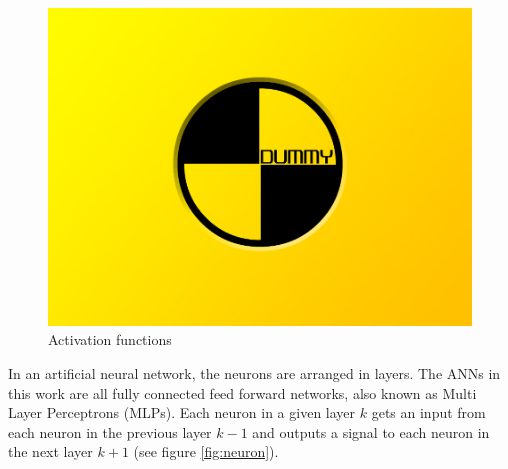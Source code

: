 \begin{figure}[h]
	\includegraphics[width=\textwidth]{src/pics/dummy.jpg}
	\caption{Activation functions \cite{Zuern2017}}
	\label{fig:activation_functions} 
\end{figure}

In an artificial neural network, the neurons are arranged in layers. The ANNs in this work are all fully connected feed forward networks, also known as Multi Layer Perceptrons (MLPs). Each neuron in a given layer $k$ gets an input from each neuron in the previous layer $k-1$ and outputs a signal to each neuron in the next layer $k+1$ (see figure \ref{fig:neuron}).

